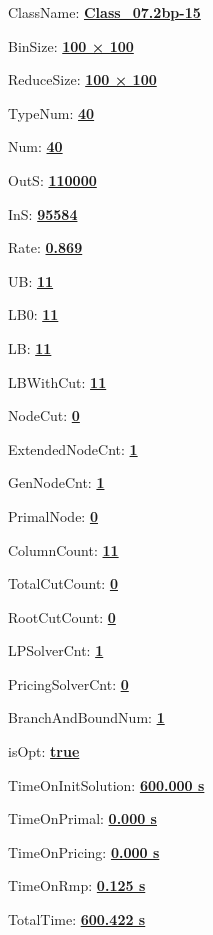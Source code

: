 \documentclass[11pt]{article}
\begin{document}
\pagestyle{empty}


ClassName: \underline{\textbf{Class_07.2bp-15}}
\par
BinSize: \underline{\textbf{100 × 100}}
\par
ReduceSize: \underline{\textbf{100 × 100}}
\par
TypeNum: \underline{\textbf{40}}
\par
Num: \underline{\textbf{40}}
\par
OutS: \underline{\textbf{110000}}
\par
InS: \underline{\textbf{95584}}
\par
Rate: \underline{\textbf{0.869}}
\par
UB: \underline{\textbf{11}}
\par
LB0: \underline{\textbf{11}}
\par
LB: \underline{\textbf{11}}
\par
LBWithCut: \underline{\textbf{11}}
\par
NodeCut: \underline{\textbf{0}}
\par
ExtendedNodeCnt: \underline{\textbf{1}}
\par
GenNodeCnt: \underline{\textbf{1}}
\par
PrimalNode: \underline{\textbf{0}}
\par
ColumnCount: \underline{\textbf{11}}
\par
TotalCutCount: \underline{\textbf{0}}
\par
RootCutCount: \underline{\textbf{0}}
\par
LPSolverCnt: \underline{\textbf{1}}
\par
PricingSolverCnt: \underline{\textbf{0}}
\par
BranchAndBoundNum: \underline{\textbf{1}}
\par
isOpt: \underline{\textbf{true}}
\par
TimeOnInitSolution: \underline{\textbf{600.000 s}}
\par
TimeOnPrimal: \underline{\textbf{0.000 s}}
\par
TimeOnPricing: \underline{\textbf{0.000 s}}
\par
TimeOnRmp: \underline{\textbf{0.125 s}}
\par
TotalTime: \underline{\textbf{600.422 s}}
\par
\newpage


\end{document}
